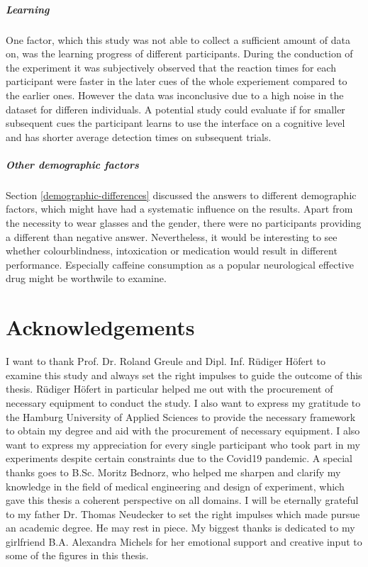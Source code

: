             \paragraph{Learning} One factor, which this study was not able to collect a sufficient amount of data on, was the learning progress of different participants. During the conduction of the experiment it was subjectively observed that the reaction times for each participant were faster in the later cues of the whole experiement compared to the earlier ones. However the data was inconclusive due to a high noise in the dataset for differen individuals. A potential study could evaluate if for smaller subsequent cues the participant learns to use the interface on a cognitive level and has shorter average detection times on subsequent trials.

            \paragraph{Other demographic factors} Section \ref*{demographic-differences} discussed the answers to different demographic factors, which might have had a systematic influence on the results. Apart from the necessity to wear glasses and the gender, there were no participants providing a different than negative answer. Nevertheless, it would be interesting to see whether colourblindness, intoxication or medication would result in different performance. Especially caffeine consumption as a popular neurological effective drug might be worthwile to examine. 

    \chapter{Acknowledgements}

        I want to thank Prof. Dr. Roland Greule and Dipl. Inf. Rüdiger Höfert to examine this study and always set the right impulses to guide the outcome of this thesis. Rüdiger Höfert in particular helped me out with the procurement of necessary equipment to conduct the study. I also want to express my gratitude to the Hamburg University of Applied Sciences to provide the necessary framework to obtain my degree and aid with the procurement of necessary equipment. I also want to express my appreciation for every single participant who took part in my experiments despite certain constraints due to the Covid19 pandemic.
        A special thanks goes to B.Sc. Moritz Bednorz, who helped me sharpen and clarify my knowledge in the field of medical engineering and design of experiment, which gave this thesis a coherent perspective on all domains. 
        I will be eternally grateful to my father Dr. Thomas Neudecker to set the right impulses which made pursue an academic degree. He may rest in piece. 
        My biggest thanks is dedicated to my girlfriend B.A. Alexandra Michels for her emotional support and creative input to some of the figures in this thesis.

